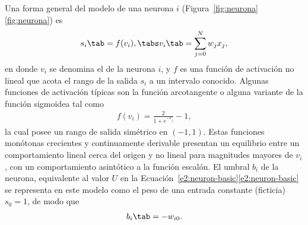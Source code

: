 Una forma general del modelo de una neurona $i$
(\iflatexml{}Figura~\ref{fig:neurona}\else\autoref{fig:neurona}\fi)
es
%
\begin{align}\label{e2:neuron-general}
  s_i \tab = f(v_i), \tabs v_i \tab = \sum_{j=0}^N w_j x_j,
\end{align}
%
en donde $v_i$ se denomina el  de la neurona
$i$, y $f$ es una función de activación no lineal que acota el rango
de la salida $s_i$ a un intervalo conocido. Algunas funciones de
activación típicas son la función
arcotangente o alguna variante de la función sigmoidea
tal como
%
\begin{align}\label{e2:sigmoid-symmetric}
  f(v_i) = \frac{2}{1+e^{-v_j}}-1,
\end{align}
%
la cual posee un rango de salida simétrico en $(-1,1)$. Estas funciones
monótonas crecientes y continuamente derivable presentan un equilibrio
entre un comportamiento lineal cerca del origen y no lineal para
magnitudes mayores de $v_i$, con un comportamiento asintótico a la
función escalón. El umbral $b_i$ de la neurona,
equivalente al valor $U$ en la
\iflatexml{}Ecuación~\ref{e2:neuron-basic}\else\autoref{e2:neuron-basic}\fi
se representa en este modelo como el peso de una entrada
constante (ficticia) $s_0=1$, de modo que
%
\begin{align}
  b_i\tab=-w_{i0}.
\end{align}
%
